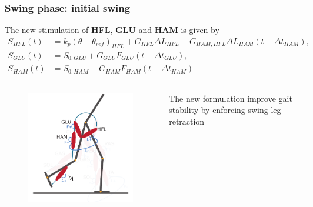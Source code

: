\documentclass[10pt]{beamer}
\begin{document}
\begin{frame}
	\frametitle{Swing phase: initial swing}
	
	\begin{block}{}
		The new stimulation of \textbf{HFL}, \textbf{GLU} and \textbf{HAM} is given by
		\begin{align*}
			S_{HFL}(t)&=  k_p (\theta-\theta_{ref})_{HFL} + G_{HFL}\Delta L_{HFL} - G_{HAM,HFL} \Delta L_{HAM}(t-\Delta t_{HAM}), \\
			S_{GLU}(t)&=  S_{0,GLU} + G_{GLU}F_{GLU}(t-\Delta t_{GLU}), \\
			S_{HAM}(t)&=  S_{0,HAM} + G_{HAM} F_{HAM} (t-\Delta t_{HAM}) 
		\end{align*}
	\end{block}
	
	\begin{columns}
		\begin{column}{.5\textwidth}
			\begin{figure}
				\centering
				\includegraphics[width=.5\textheight]{images/new_model/swing/muscle_initial.pdf}
			\end{figure}
		\end{column}
		\begin{column}{.5\textwidth}
			\begin{exampleblock}{}
				The new formulation improve gait stability by enforcing swing-leg retraction
			\end{exampleblock}
		\end{column}
	\end{columns}	
\end{frame}
\end{document}
